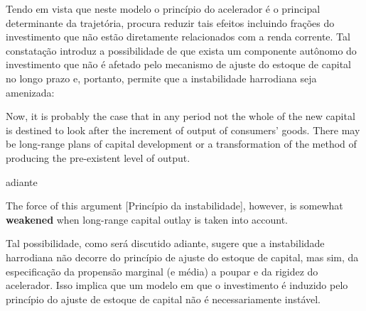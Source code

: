 


Tendo em vista que neste modelo o princípio do acelerador é o principal determinante da trajetória, \textcite[p.~26--28]{harrod_essay_1939} procura reduzir tais efeitos incluindo frações do investimento que não estão diretamente relacionados com a renda corrente. Tal constatação introduz a possibilidade de que exista um componente autônomo do investimento que não é afetado pelo mecanismo de ajuste do estoque de capital no longo prazo e, portanto, permite que a instabilidade harrodiana seja amenizada:

\begin{citacao}
Now, it is probably the case that in any period not the whole of the new capital is destined to look after the increment of output of consumers' goods. There may be  long-range plans of capital development or a transformation  of the method of  producing  the pre-existent level of output. \cite[p.~17]{harrod_essay_1939}
\end{citacao}
adiante
\begin{citacao}
The force  of this  argument [Princípio da instabilidade], however, is somewhat \textbf{weakened} when long-range  capital outlay is taken into account.
\cite[p.~26, grifos adicionados]{harrod_essay_1939}
\end{citacao}
Tal possibilidade, como será discutido adiante, sugere que a instabilidade harrodiana não decorre do princípio de ajuste do estoque de capital, mas sim, da especificação da propensão marginal (e média) a poupar e da rigidez do acelerador. Isso implica que um modelo em que o investimento é induzido pelo princípio do ajuste de estoque de capital não é necessariamente instável.

